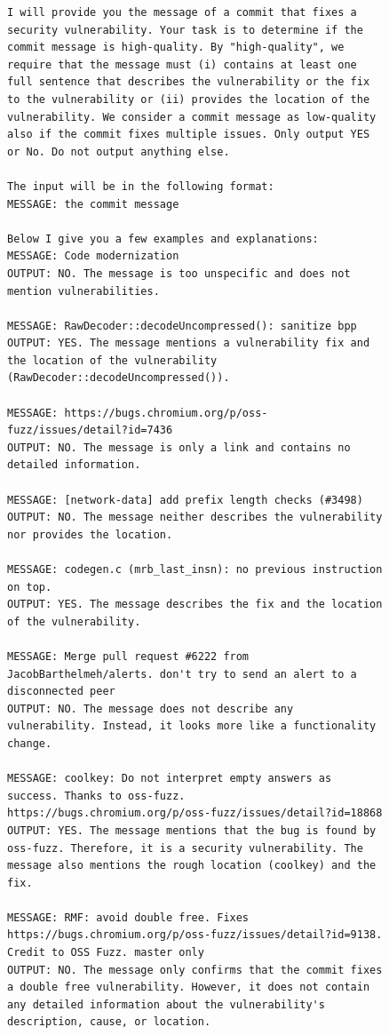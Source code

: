 \begin{figure}[h]
\centering
\begin{tcolorbox}[colback=white, colframe=black, fontupper=\scriptsize]
\begin{verbatim}
I will provide you the message of a commit that fixes a security vulnerability. Your task is to determine if the commit message is high-quality. By "high-quality", we require that the message must (i) contains at least one full sentence that describes the vulnerability or the fix to the vulnerability or (ii) provides the location of the vulnerability. We consider a commit message as low-quality also if the commit fixes multiple issues. Only output YES or No. Do not output anything else.

The input will be in the following format:
MESSAGE: the commit message

Below I give you a few examples and explanations:
MESSAGE: Code modernization
OUTPUT: NO. The message is too unspecific and does not mention vulnerabilities.

MESSAGE: RawDecoder::decodeUncompressed(): sanitize bpp
OUTPUT: YES. The message mentions a vulnerability fix and the location of the vulnerability (RawDecoder::decodeUncompressed()).

MESSAGE: https://bugs.chromium.org/p/oss-fuzz/issues/detail?id=7436
OUTPUT: NO. The message is only a link and contains no detailed information.

MESSAGE: [network-data] add prefix length checks (#3498)
OUTPUT: NO. The message neither describes the vulnerability nor provides the location.

MESSAGE: codegen.c (mrb_last_insn): no previous instruction on top.
OUTPUT: YES. The message describes the fix and the location of the vulnerability.

MESSAGE: Merge pull request #6222 from JacobBarthelmeh/alerts. don't try to send an alert to a disconnected peer
OUTPUT: NO. The message does not describe any vulnerability. Instead, it looks more like a functionality change.

MESSAGE: coolkey: Do not interpret empty answers as success. Thanks to oss-fuzz. https://bugs.chromium.org/p/oss-fuzz/issues/detail?id=18868
OUTPUT: YES. The message mentions that the bug is found by oss-fuzz. Therefore, it is a security vulnerability. The message also mentions the rough location (coolkey) and the fix.

MESSAGE: RMF: avoid double free. Fixes https://bugs.chromium.org/p/oss-fuzz/issues/detail?id=9138. Credit to OSS Fuzz. master only
OUTPUT: NO. The message only confirms that the commit fixes a double free vulnerability. However, it does not contain any detailed information about the vulnerability's description, cause, or location.


\end{verbatim}
\end{tcolorbox}
\end{figure}
